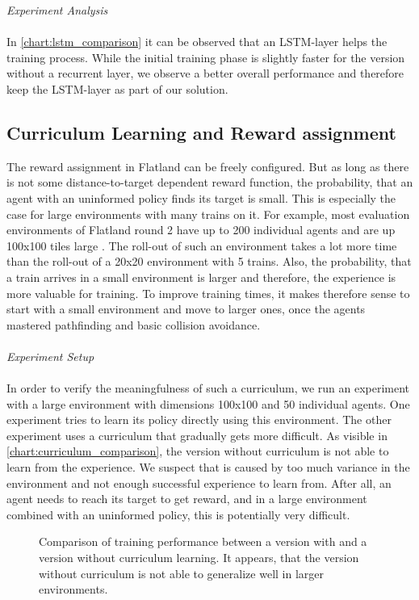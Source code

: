 \textit{Experiment Analysis}\\\\
In \autoref{chart:lstm_comparison} it can be observed that an LSTM-layer helps the training process. While the initial training phase is slightly faster for the version without a recurrent layer, we observe a better overall performance and therefore keep the LSTM-layer as part of our solution.

\subsection*{Curriculum Learning and Reward assignment}\label{curriculum_learning}
The reward assignment in Flatland can be freely configured. But as long as there is not some distance-to-target dependent reward function, the probability, that an agent with an uninformed policy finds its target is small. This is especially the case for large environments with many trains on it. For example, most evaluation environments of Flatland round 2 have up to 200 individual agents and are up 100x100 tiles large \cite{flatland_faq}. The roll-out of such an environment takes a lot more time than the roll-out of a 20x20 environment with 5 trains. Also, the probability, that a train arrives in a small environment is larger and therefore, the experience is more valuable for training.
To improve training times, it makes therefore sense to start with a small environment and move to larger ones, once the agents mastered pathfinding and basic collision avoidance.\\\\
\textit{Experiment Setup}\\\\
In order to verify the meaningfulness of such a curriculum, we run an experiment with a large environment with dimensions 100x100 and 50 individual agents. One experiment tries to learn its policy directly using this environment. The other experiment uses a curriculum that gradually gets more difficult.
As visible in \autoref{chart:curriculum_comparison}, the version without curriculum is not able to learn from the experience. We suspect that is caused by too much variance in the environment and not enough successful experience to learn from. After all, an agent needs to reach its target to get reward, and in a large environment combined with an uninformed policy, this is potentially very difficult.
\begin{figure}[H]
	\begin{center}
		
	\end{center}
	\caption{Comparison of training performance between a version with and a version without curriculum learning. It appears, that the version without curriculum is not able to generalize well in larger environments.}
	\label{chart:curriculum_comparison}
\end{figure}

